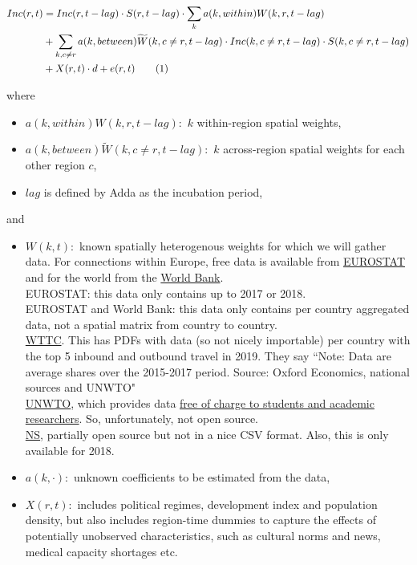 \documentclass{article}
\newcommand\numberthis{\addtocounter{equation}{1}\tag{\theequation}}
\begin{document}
\begin{align*}
    Inc(r,t)    &= Inc(r, t-lag) \cdot S(r, t-lag) \cdot \sum_{k} a(k, within)W(k, r, t-lag)\\
                &+ \sum_{k, c \neq r} a(k,between)\widetilde{W}(k, c \neq r, t-lag) \cdot Inc(k, c \neq r, t-lag) \cdot S(k, c \neq r, t-lag) \\
                &+ X(r,t) \cdot d + e(r,t) \numberthis \label{eq:adda_model}
\end{align*}

where

\begin{itemize}
    \item $a(k, within)W(k, r, t-lag):$ $k$ within-region spatial weights,
    \item $a(k, between)\widetilde{W}(k, c \neq r, t-lag):$ $k$ across-region spatial weights for each other region $c$,
    \item $lag$ is defined by Adda as the incubation period,
\end{itemize}

and

\begin{itemize}
    \item $W(k,t):$ known spatially heterogenous weights for which we will gather data. For connections within Europe, free data is available from \href{https://ec.europa.eu/eurostat/web/transport/data/main-tables}{EUROSTAT} and for the world from the \href{http://wdi.worldbank.org/table}{World Bank}.
            \\ \textbullet \quad EUROSTAT: this data only contains up to 2017 or 2018.
            \\ \textbullet \quad EUROSTAT and World Bank: this data only contains per country aggregated data, not a spatial matrix from country to country.
            \\ \textbullet \quad \href{https://www.wttc.org/economic-impact/country-analysis/country-data}{WTTC}. This has PDFs with data (so not nicely importable) per country with the top 5 inbound and outbound travel in 2019. They say ``Note: Data are average shares over the 2015-2017 period. Source: Oxford Economics, national sources and UNWTO"
            \\ \textbullet \quad \href{https://www.unwto.org/statistics}{UNWTO}, which provides data \href{https://webunwto.s3.eu-west-1.amazonaws.com/s3fs-public/2020-01/notaparaestudianteswebrev2019.pdf}{free of charge to students and academic researchers}. So, unfortunately, not open source.
            \\ \textbullet \quad \href{https://dashboards.nsjaarverslag.nl/reizigersgedrag}{NS}, partially open source but not in a nice CSV format. Also, this is only available for 2018.
    \item $a(k, \cdot):$ unknown coefficients to be estimated from the data,
    \item $X(r,t):$ includes political regimes, development index and population density, but also includes region-time dummies to capture the effects of potentially unobserved characteristics, such as cultural norms and news, medical capacity shortages etc.
\end{itemize}
\end{document}
